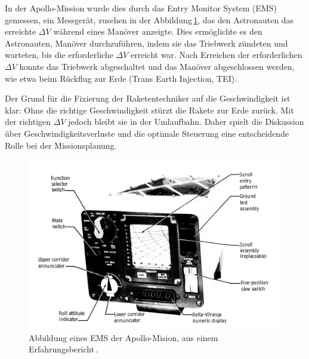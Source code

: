 In der Apollo-Mission wurde dies durch das Entry Monitor System (EMS) gemessen, ein Messgerät, zusehen in der Abbildung\,\ref{fig:leo:ems}, das den Astronauten das erreichte \(\Delta V\) während eines Manöver anzeigte. 
Dies ermöglichte es den Astronauten, Manöver durchzuführen, indem sie das Triebwerk zündeten und warteten, bis die erforderliche \(\Delta V\) erreicht war. 
Nach Erreichen der erforderlichen \(\Delta V\) konnte das Triebwerk abgeschaltet und das Manöver abgeschlossen werden, wie etwa beim Rückflug zur Erde (Trans Earth Injection, TEI).

Der Grund für die Fixierung der Raketentechniker auf die Geschwindigkeit ist klar: Ohne die richtige Geschwindigkeit stürzt die Rakete zur Erde zurück. 
Mit der richtigen \(\Delta V\) jedoch bleibt sie in der Umlaufbahn. Daher spielt die Diskussion über Geschwindigkeitsverluste und die optimale Steuerung eine entscheidende Rolle bei der Missionsplanung.


\begin{figure}
	\centering
	\includegraphics[width=\linewidth]{papers/leo/Grafiken/EMS.png}
	\caption{Abbildung eines EMS der Apollo-Mision, aus einem Erfahrungsbericht\,\cite{leo:wilson1976apollo}.}
	\label{fig:leo:ems}
\end{figure}


